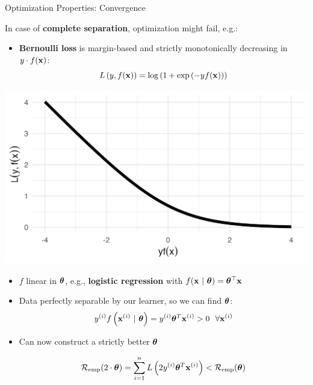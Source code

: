 \documentclass[11pt,compress,t,notes=noshow, xcolor=table]{beamer}
\begin{document}
\begin{vbframe}{Optimization Properties: Convergence}

\footnotesize

In case of \textbf{complete separation}, optimization might 
fail, e.g.:

\vspace{0.5cm}

\begin{minipage}{0.7\textwidth}
  \begin{itemize}
    \item \textbf{Bernoulli loss} is margin-based and strictly monotonically decreasing in
    $y \cdot f(\mathbf{x})$: 
    $$L\left(y, f(\mathbf{x})\right) = \log \left( 1 + \exp \left( - y  f(\mathbf{x}) \right)\right)$$
  \end{itemize}
\end{minipage}%
\begin{minipage}{0.05\textwidth}
  \phantom{foo}
\end{minipage}%
\begin{minipage}{0.25\textwidth}
  \includegraphics[width=\textwidth]{figure/bernoulli.png}
\end{minipage}%

\begin{itemize}
  \item $f$ linear in $\bm{\theta}$, e.g.,
  \textbf{logistic regression} with $f(\mathbf{x} ~|~ \bm{\theta}) = \bm{\theta}^\top \mathbf{x}$
  \item Data perfectly separable by our learner, so we can find $\bm{\theta}$:
   $$ y^{(i)} f\left(\mathbf{x}^{(i)} ~|~ \bm{\theta}\right) = y^{(i)} \bm{\theta}^T \mathbf{x}^{(i)} > 0 ~~ \forall \mathbf{x}^{(i)}$$
  
\item Can now construct a strictly better $\bm{\theta}$

$$    \mathcal{R}_{\text{emp}}(2 \cdot \bm{\theta}) = \sum\limits_{i=1}^n  
    L \left( 2 y^{(i)} \bm{\theta}^T \mathbf{x}^{(i)}  
    \right) < \mathcal{R}_{\text{emp}}(\bm{\theta})
$$


\end{itemize}
\end{vbframe}
\end{document}
